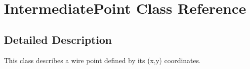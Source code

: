 \hypertarget{class_intermediate_point}{}\section{Intermediate\+Point Class Reference}
\label{class_intermediate_point}


\subsection{Detailed Description}
This class describes a wire point defined by its (x,y) coordinates. 